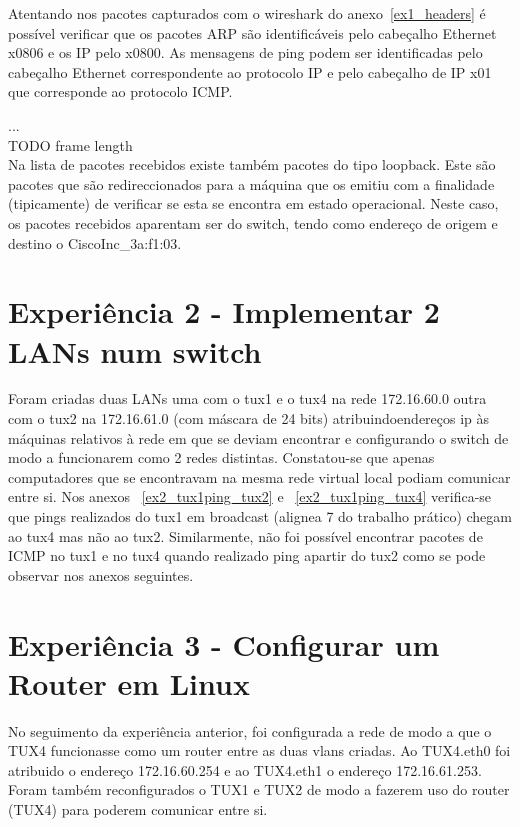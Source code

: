 \documentclass[11pt,a4paper,reqno]{report}
\numberwithin{equation}{section}
\begin{document}
Atentando nos pacotes capturados com o wireshark do anexo~\ref{ex1_headers} é possível verificar que os pacotes ARP são identificáveis pelo cabeçalho Ethernet x0806 e os IP pelo x0800. As mensagens de ping podem ser identificadas pelo cabeçalho Ethernet correspondente ao protocolo IP e pelo cabeçalho de IP x01 que corresponde ao protocolo ICMP.

...\\ TODO frame length \\

Na lista de pacotes recebidos existe também pacotes do tipo loopback. Este são pacotes que são redireccionados para a máquina que os emitiu com a finalidade (tipicamente) de verificar se esta se encontra em estado operacional. Neste caso, os pacotes recebidos aparentam ser do switch, tendo como endereço de origem e destino o CiscoInc\_3a:f1:03.

\section{Experiência 2 - Implementar 2 LANs num switch}

Foram criadas duas LANs uma com o tux1 e o tux4 na rede 172.16.60.0 outra com o tux2 na 172.16.61.0 (com máscara de 24 bits) atribuindoendereços  ip às máquinas relativos à rede em que se deviam encontrar e configurando o switch de modo a funcionarem como 2 redes distintas. Constatou-se que apenas  computadores que se encontravam na mesma rede virtual local podiam comunicar entre si. Nos anexos ~\ref{ex2_tux1ping_tux2} e ~\ref{ex2_tux1ping_tux4} verifica-se que pings realizados do tux1 em broadcast (alignea 7 do trabalho prático) chegam ao tux4 mas não ao tux2. Similarmente, não foi possível encontrar pacotes de ICMP no tux1 e no tux4 quando realizado ping apartir do tux2 como se pode observar nos anexos seguintes.


\section{Experiência 3 - Configurar um Router em Linux}

No seguimento da experiência anterior, foi configurada a rede de modo a que o TUX4 funcionasse como um router entre as duas vlans criadas. Ao TUX4.eth0 foi atribuido o endereço 172.16.60.254 e ao TUX4.eth1 o  endereço 172.16.61.253. Foram também reconfigurados o TUX1 e  TUX2 de modo a fazerem uso do router (TUX4) para poderem comunicar entre si.\\
\end{document}
